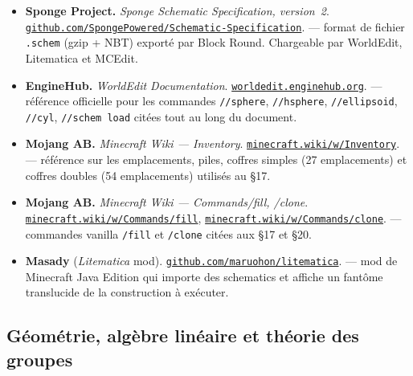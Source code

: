 \documentclass[12pt,a4paper]{scrartcl}
\newcommand{\code}[1]{\texttt{\small #1}}
\newcommand{\cmd}[1]{\textcolor{earth}{\texttt{\small #1}}}
\newcommand{\biblink}[2]{\href{#1}{\nolinkurl{#2}}}
\begin{document}
\begin{itemize}[leftmargin=1.4em,itemsep=0.3em,topsep=0.3em]
  \item \textbf{Sponge Project.} \emph{Sponge Schematic Specification, version~2}.
        \biblink{https://github.com/SpongePowered/Schematic-Specification}{github.com/SpongePowered/Schematic-Specification}.
        --- format de fichier \code{.schem} (gzip + NBT) exporté par Block Round. Chargeable par WorldEdit, Litematica et MCEdit.

  \item \textbf{EngineHub.} \emph{WorldEdit Documentation}.
        \biblink{https://worldedit.enginehub.org/}{worldedit.enginehub.org}.
        --- référence officielle pour les commandes \cmd{//sphere}, \cmd{//hsphere}, \cmd{//ellipsoid}, \cmd{//cyl}, \cmd{//schem load} citées tout au long du document.

  \item \textbf{Mojang AB.} \emph{Minecraft Wiki --- Inventory}.
        \biblink{https://minecraft.wiki/w/Inventory}{minecraft.wiki/w/Inventory}.
        --- référence sur les emplacements, piles, coffres simples (27 emplacements) et coffres doubles (54 emplacements) utilisés au §17.

  \item \textbf{Mojang AB.} \emph{Minecraft Wiki --- Commands/fill, /clone}.
        \biblink{https://minecraft.wiki/w/Commands/fill}{minecraft.wiki/w/Commands/fill},
        \biblink{https://minecraft.wiki/w/Commands/clone}{minecraft.wiki/w/Commands/clone}.
        --- commandes vanilla \cmd{/fill} et \cmd{/clone} citées aux §17 et §20.

  \item \textbf{Masady} (\emph{Litematica} mod).
        \biblink{https://github.com/maruohon/litematica}{github.com/maruohon/litematica}.
        --- mod de Minecraft Java Edition qui importe des schematics et affiche un fantôme translucide de la construction à exécuter.
\end{itemize}

\subsection*{Géométrie, algèbre linéaire et théorie des groupes}
\end{document}
